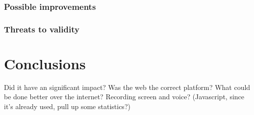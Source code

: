 \documentclass[nofilelist,dvipsnames]{cslthse-msc}
\begin{document}
			\subsection{Possible improvements}

			\subsection{Threats to validity}




	\chapter{Conclusions}

		Did it have an significant impact? Was the web the correct platform? What
		could be done better over the internet? Recording screen and voice?
		(Javascript, since it's already used, pull up some statistics?)


	\checkoddpage
	\ifoddpage
	\else
		 \newpage
		 \thispagestyle{empty}
		 \mbox{ }
	\fi
\end{document}
